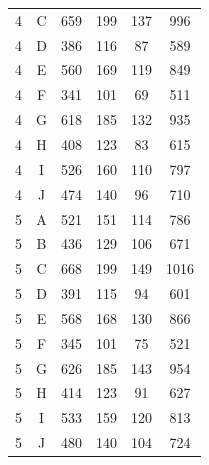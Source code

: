 \begin{table}[h]
\begin{tabular}{|c|c|c|c|c|c|}
4 & C & 659 & 199 & 137 & 996 \\
4 & D & 386 & 116 & 87 & 589 \\
4 & E & 560 & 169 & 119 & 849 \\
4 & F & 341 & 101 & 69 & 511 \\
4 & G & 618 & 185 & 132 & 935 \\
4 & H & 408 & 123 & 83 & 615 \\
4 & I & 526 & 160 & 110 & 797 \\
4 & J & 474 & 140 & 96 & 710 \\
5 & A & 521 & 151 & 114 & 786 \\
5 & B & 436 & 129 & 106 & 671 \\
5 & C & 668 & 199 & 149 & 1016 \\
5 & D & 391 & 115 & 94 & 601 \\
5 & E & 568 & 168 & 130 & 866 \\
5 & F & 345 & 101 & 75 & 521 \\
5 & G & 626 & 185 & 143 & 954 \\
5 & H & 414 & 123 & 91 & 627 \\
5 & I & 533 & 159 & 120 & 813 \\
5 & J & 480 & 140 & 104 & 724 \\
\hline
\end{tabular}
\end{table}
